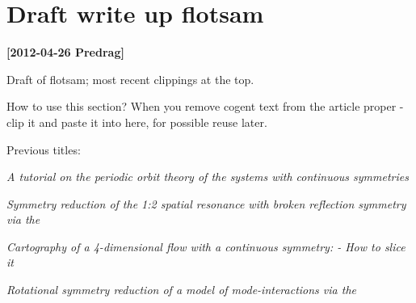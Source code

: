 

\section{Draft write up flotsam}
\label{chap:flotsam2modes}

\noindent
{\bf [2012-04-26 Predrag]}
{\color{red}
Draft of  flotsam; most recent clippings at the top.

How to use this section? When you remove cogent text from the article
proper - clip  it and paste it into here, for possible reuse later.
}
\bigskip\bigskip

Previous titles:

{\em A tutorial on the periodic orbit theory of the systems with continuous
symmetries}

{\em Symmetry reduction of the 1:2 spatial resonance with broken reflection
symmetry via the \mslices}

{\em Cartography of a 4-dimensional flow with a continuous symmetry:
- How to slice it}

{\em Rotational symmetry reduction of a model of mode-interactions via the
\mslices}

